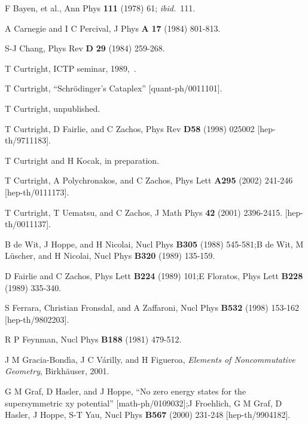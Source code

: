 \documentclass[a4paper,12pt]{article}%
\begin{document}
\begin{thebibliography}{9}                                                                                                %

F Bayen, et al., Ann Phys \textbf{111} (1978) 61; \emph{ibid.}~111.

A Carnegie and I C Percival, J Phys \textbf{A} \textbf{17}
(1984) 801-813.

S-J Chang, Phys Rev \textbf{D} \textbf{29} (1984) 259-268.

T Curtright, ICTP seminar, 1989,\ .

T Curtright, ``Schr\"{o}dinger's Cataplex'' [quant-ph/0011101].

T Curtright, unpublished.

T Curtright, D Fairlie, and C Zachos, Phys Rev \textbf{D58}
(1998) 025002 [hep-th/9711183].

T Curtright and H Kocak, in preparation.

T Curtright, A Polychronakos, and C Zachos, Phys Lett
\textbf{A295} (2002) 241-246 [hep-th/0111173].

T Curtright, T Uematsu, and C Zachos, J Math Phys \textbf{42}
(2001) 2396-2415. [hep-th/0011137].

B de Wit, J Hoppe, and H Nicolai, Nucl Phys \textbf{B305}
(1988) 545-581;\newline B de Wit, M L\"{u}scher, and H Nicolai, Nucl Phys
\textbf{B320} (1989) 135-159.

D Fairlie and C Zachos, Phys Lett \textbf{B224} (1989)
101;\newline E Floratos, Phys Lett \textbf{B228} (1989) 335-340.

S Ferrara, Christian Fronsdal, and A Zaffaroni, Nucl Phys
\textbf{B532} (1998) 153-162 [hep-th/9802203].

R P Feynman, Nucl Phys \textbf{B188} (1981) 479-512.

J M Gracia-Bond\'{\i}a, J C V\'{a}rilly, and H Figueroa,
\textit{Elements of Noncommutative Geometry}, Birkh\"{a}user, 2001.

G M Graf, D Hasler, and J Hoppe, ``No zero energy states for
the supersymmetric x\coordHE{}y\coordHE{} potential'' [math-ph/0109032];\newline J
Froehlich, G M Graf, D Hasler, J Hoppe, S-T Yau, Nucl Phys \textbf{B567}
(2000) 231-248 [hep-th/9904182].


\end{thebibliography}
\end{document}
